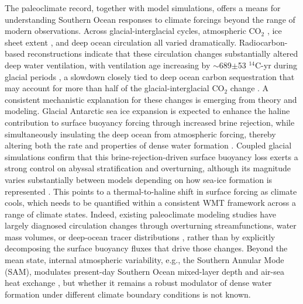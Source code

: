 \documentclass[pdflatex,sn-nature]{sn-jnl}
\begin{document}
The paleoclimate record, together with model simulations, offers a means for understanding Southern Ocean responses to climate forcings beyond the range of modern observations. Across glacial-interglacial cycles, atmospheric CO$_2$ \cite{SigmanBoyle2000,Kohfeld2005}, ice sheet extent \cite{huybrechts1990antarctic}, and deep ocean circulation \cite{rafter2022global} all varied dramatically. Radiocarbon-based reconstructions indicate that these circulation changes substantially altered deep water ventilation, with ventilation age increasing by $\sim$689$\pm$53 $^{14}$C-yr during glacial periods \cite{Skinner2017}, a slowdown closely tied to deep ocean carbon sequestration that may account for more than half of the glacial-interglacial CO$_2$ change \cite{Skinner2017}. A consistent mechanistic explanation for these changes is emerging from theory and modeling. Glacial Antarctic sea ice expansion is expected to enhance the haline contribution to surface buoyancy forcing through increased brine rejection, while simultaneously insulating the deep ocean from atmospheric forcing, thereby altering both the rate and properties of dense water formation \cite{Ferrari2014}. Coupled glacial simulations confirm that this brine-rejection-driven surface buoyancy loss exerts a strong control on abyssal stratification and overturning, although its magnitude varies substantially between models depending on how sea-ice formation is represented \cite{Marzocchi2017}. This points to a thermal-to-haline shift in surface forcing as climate cools, which needs to be quantified within a consistent WMT framework across a range of climate states. Indeed, existing paleoclimate modeling studies have largely diagnosed circulation changes through overturning streamfunctions, water mass volumes, or deep-ocean tracer distributions \cite{Weber2007,Wainer2012}, rather than by explicitly decomposing the surface buoyancy fluxes that drive those changes. Beyond the mean state, internal atmospheric variability, e.g., the Southern Annular Mode (SAM), modulates present-day Southern Ocean mixed-layer depth and air-sea heat exchange \cite{Sallee2010}, but whether it remains a robust modulator of dense water formation under different climate boundary conditions is not known.
\end{document}
